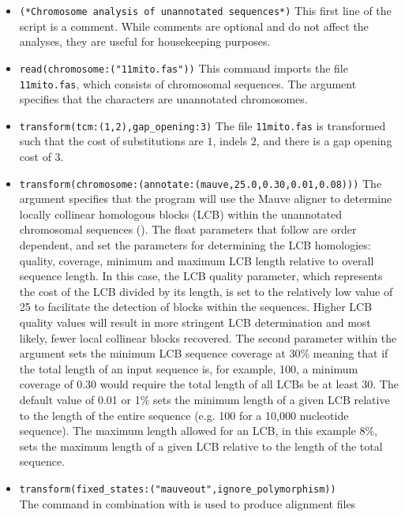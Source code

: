 \begin{itemize} 
\item \texttt{(*Chromosome analysis of unannotated
sequences*)} This first line of the script is a comment. While
comments are optional and do not affect the analyses, they are
useful for housekeeping purposes.  
\item \texttt{read(chromosome:("11mito.fas"))} This command imports the
file \texttt{11mito.fas}, which consists of chromosomal sequences.
The argument  specifies that the characters
are unannotated chromosomes.  
\item \texttt{transform(tcm:(1,2),gap\_opening:3)} The file \texttt{11mito.fas}
is transformed such that the cost of substitutions are $1$, indels
$2$, and there is a gap opening cost of $3$.  
\item \texttt{transform(chromosome:(annotate:(mauve,25.0,0.30,0.01,0.08)))} 
The argument   specifies that the program
will use the Mauve aligner \cite{darlingetal2004} to determine
locally collinear homologous blocks (LCB) within the unannotated
chromosomal sequences (). The float parameters
that follow  are order dependent, and set the
parameters for determining the LCB homologies: quality, coverage,
minimum and maximum LCB length relative to overall sequence length.
In this case, the LCB quality parameter, which represents the cost
of the LCB divided by its length, is set to the relatively low value
of 25 to facilitate the detection of blocks within the sequences.
Higher LCB quality values will result in more stringent LCB
determination and most likely, fewer local collinear blocks recovered.
The second parameter within the argument 
sets the minimum LCB sequence coverage at 30\% meaning that if the
total length of an input sequence is, for example, 100, a minimum
coverage of 0.30 would require the total length of all LCBs be at
least 30. The default value of 0.01 or 1\% sets the minimum length
of a given LCB relative to the length of the entire sequence (e.g.
100 for a 10,000 nucleotide sequence). The maximum length allowed
for an LCB, in this example 8\%, sets the maximum length of a given
LCB relative to the length of the total sequence.
\item \texttt{transform(fixed\_states:("mauveout",ignore\_polymorphism))}\\ 
The  command in combination with
 is used to produce alignment files

\end{itemize}
